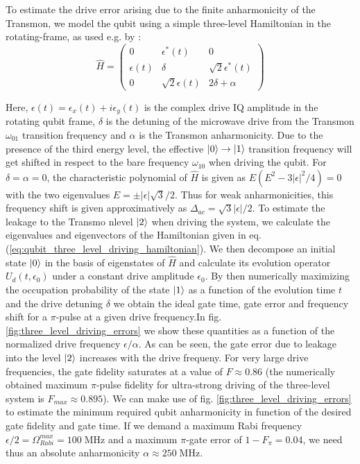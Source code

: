 \smallskip

To estimate the drive error arising due to the finite anharmonicity of the Transmon, we model the qubit using a simple three-level Hamiltonian in the rotating-frame, as used e.g. by \cite{motzoi_simple_2009}:
%
\begin{equation}
\hat{H} = \left(
						 \begin{array}{ccc}
						0 & \epsilon^*(t) & 0 \\
						\epsilon(t) & \delta & \sqrt{2}\epsilon^*(t) \\
						0 & \sqrt{2}\epsilon(t) & 2\delta + \alpha
						\end{array}
					\right) \label{eq:qubit_three_level_driving_hamiltonian}
\end{equation}
%

Here, $\epsilon(t) = \epsilon_x(t)+i\epsilon_y(t)$ is the complex drive IQ amplitude in the rotating qubit frame, $\delta$ is the detuning of the microwave drive from the Transmon $\omega_{01}$ transition frequency and $\alpha$ is the Transmon anharmonicity. Due to the presence of the third energy level, the effective $\left| 0 \right>\to\left| 1 \right>$ transition frequency will get shifted in respect to the bare frequency $\omega_{10}$ when driving the qubit. For $\delta = \alpha = 0$, the characteristic polynomial of $\hat{H}$ is given as $E(E^2-3|\epsilon|^2/4) = 0$ with the two eigenvalues $E=\pm |\epsilon|\sqrt{3}/2$. Thus for weak anharmonicities, this frequency shift is given approximatively as $\Delta_{ac}=\sqrt{3}|\epsilon|/2$. To estimate the leakage to the Transmo nlevel $\left| 2 \right>$ when driving the system, we calculate the eigenvalues and eigenvectors of the Hamiltonian given in eq. (\ref{eq:qubit_three_level_driving_hamiltonian}). We then decompose an initial state $\left| 0 \right>$ in the basis of eigenstates of $\hat{H}$ and calculate its evolution operator $U_d(t,\epsilon_0)$ under a constant drive amplitude $\epsilon_0$. By then numerically maximizing the occupation probability of the state $\left| 1 \right>$ as a function of the evolution time $t$ and the drive detuning $\delta$ we obtain the ideal gate time, gate error and frequency shift for a $\pi$-pulse at a given drive frequency.In fig. \ref{fig:three_level_driving_errors} we show these quantities as a function of the normalized drive frequency $\epsilon/\alpha$. As can be seen, the gate error due to leakage into the level $\left| 2 \right>$ increases with the drive frequeny. For very large drive frequencies, the gate fidelity saturates at a value of $F\approx 0.86$ (the numerically obtained maximum $\pi$-pulse fidelity for ultra-strong driving of the three-level system is $F_{max}\approx 0.895$). We can make use of fig. \ref{fig:three_level_driving_errors} to estimate the minimum required qubit anharmonicity in function of the desired gate fidelity and gate time. If we demand a maximum Rabi frequency $\epsilon/2=\Omega_{Rabi}^{max}=100\;\mathrm{MHz}$ and a maximum $\pi$-gate error of $1-F_\pi = 0.04$, we need thus an absolute anharmonicity $\alpha\approx 250\;\mathrm{MHz}$.

